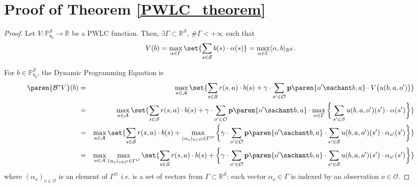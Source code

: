 \section{Proof of Theorem \ref{PWLC_theorem}}
\begin{proof}
Let $V: \mathbb{P}^{\mathcal{S}}_{b_0} \rightarrow \mathbb{R}$ be a PWLC function. 
Then, $\exists \Gamma \subset \mathbb{R}^{\mathcal{S}}$, $\# \Gamma < + \infty$ such that 
\[ V(b)=\max_{\alpha \in \Gamma} \set{ \sum_{s \in \mathcal{S}} b(s) \cdot \alpha(s) } = \max_{\alpha \in \Gamma} \langle \alpha, b \rangle_{\mathbb{R}^{\mathcal{S}}}  . \] 

For $b \in \mathbb{P}^{\mathcal{S}}_{b_0}$, the Dynamic Programming Equation is
\begin{eqnarray*}
\paren{\mathcal{B}^* V}(b) & = & \max_{a \in \mathcal{A}} \set{ \sum_{s \in \mathcal{S}} r(s,a) \cdot b(s) + \gamma \cdot \sum_{o' \in \mathcal{O}} \textbf{p} \paren{o' \sachant b , a } \cdot V \big( u(b,a,o') \big) } \\
& = & \max_{a \in \mathcal{A}} \set{ \sum_{s \in \mathcal{S}} r(s,a) \cdot b(s) + \gamma \cdot \sum_{o' \in \mathcal{O}} \textbf{p} \paren{o' \sachant b , a } \cdot \max_{\alpha \in \Gamma} \bigg\{ \sum_{s' \in \mathcal{S}} u(b,a,o')(s') \cdot \alpha(s') \bigg\} } \\
& = & \max_{a \in \mathcal{A}} \set{ \sum_{s \in \mathcal{S}} r(s,a) \cdot b(s) +  \max_{(\alpha_{o})_{o \in \mathcal{O}} \in \Gamma^\mathcal{O}} \bigg\{ \gamma \cdot \sum_{o' \in \mathcal{O}} \textbf{p} \paren{o' \sachant b , a } \cdot \sum_{s' \in \mathcal{S}} u(b,a,o')(s') \cdot \alpha_{o'}(s') \bigg\} } \\
& = & \max_{a \in \mathcal{A}} \max_{(\alpha_{o})_{o \in \mathcal{O}} \in \Gamma^\mathcal{O}} \set{ \sum_{s \in \mathcal{S}} r(s,a) \cdot b(s) + \bigg\{ \gamma \cdot \sum_{o' \in \mathcal{O}} \textbf{p} \paren{o' \sachant b , a } \cdot \sum_{s' \in \mathcal{S}} u(b,a,o')(s') \cdot \alpha_{o'}(s') \bigg\} }
\end{eqnarray*}
where $(\alpha_{o})_{o \in \mathcal{O}}$ is an element of $\Gamma^\mathcal{O}$
\textit{i.e.} is a set of vectors from $\Gamma \subset \mathbb{R}^{\mathcal{S}}$:
each vector $\alpha_{o} \in \Gamma$ is indexed by an observation $o \in \mathcal{O}$.


\end{proof}
